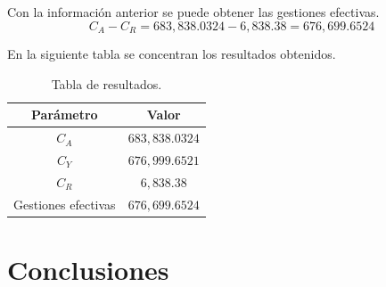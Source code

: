 \documentclass[11pt,letterpaper]{article}
\begin{document}
Con la información anterior se puede obtener las gestiones efectivas.
\begin{equation}
    C_A-C_R=683,838.0324-6,838.38=676,699.6524
\end{equation}

En la siguiente tabla se concentran los resultados obtenidos.
\begin{table}[ht]
    \centering
    \begin{tabular}{|c|c|}
    \hline
    Parámetro & Valor   \\ \hline
    $C_A$ & $683,838.0324$  \\ \hline
    $C_Y$ & $676,999.6521$  \\ \hline
    $C_R$ & $6,838.38$  \\ \hline
    Gestiones efectivas & $676,699.6524$  \\ \hline
    \end{tabular}
    \caption{Tabla de resultados.}
    \label{tab:my-table}
\end{table}

\section{Conclusiones}
\end{document}
